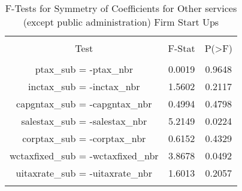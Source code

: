 
\begin{table}[!htbp] \centering 
  \caption{F-Tests for Symmetry of Coefficients for Other services (except public administration) Firm Start Ups} 
  \label{81Ftests} 
\begin{tabular}{@{\extracolsep{5pt}} ccc} 
\\[-1.8ex]\hline 
\hline \\[-1.8ex] 
Test & F-Stat & P(\textgreater F) \\ 
\hline \\[-1.8ex] 
ptax\_sub = -ptax\_nbr & 0.0019 & 0.9648 \\ 
inctax\_sub = -inctax\_nbr & 1.5602 & 0.2117 \\ 
capgntax\_sub = -capgntax\_nbr & 0.4994 & 0.4798 \\ 
salestax\_sub = -salestax\_nbr & 5.2149 & 0.0224 \\ 
corptax\_sub = -corptax\_nbr & 0.6152 & 0.4329 \\ 
wctaxfixed\_sub = -wctaxfixed\_nbr & 3.8678 & 0.0492 \\ 
uitaxrate\_sub = -uitaxrate\_nbr & 1.6013 & 0.2057 \\ 
\hline \\[-1.8ex] 
\end{tabular} 
\end{table} 
